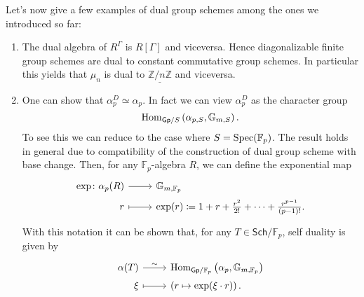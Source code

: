 \noindent
Let's now give a few examples of dual group schemes among the ones we introduced so far:
\begin{ex}[]\leavevmode\vspace{-.2\baselineskip}\label{ex:GroupSchemeDuality}
\begin{enumerate}
	\item The dual algebra of $R^\Gamma$ is $R[\Gamma]$ and viceversa.
		Hence diagonalizable finite group schemes are dual to constant commutative group schemes.
		In particular this yields that $\mu_n$ is dual to $\underline{\mathbb{Z}/n\mathbb{Z}}$
		and viceversa.

	\item One can show that $\alpha_p^D \simeq \alpha_p$.
		In fact we can view $\alpha_p^D$ as the character group
		\begin{equation*}
			\operatorname{Hom}_{\mathsf{Gp}/S} \left( \alpha_{p,S}, \mathbb{G}_{m,S} \right)
		.\end{equation*}
		To see this we can reduce to the case where 
		$S = \operatorname{Spec}(\mathbb{F}_p)$.
		The result holds in general due to compatibility of the construction of
		dual group scheme with base change.
		Then, for any $\mathbb{F}_{p}$-algebra $R$, we can define the exponential map
		\begin{equation*}
		\begin{tikzcd}[row sep = 0ex
			,/tikz/column 1/.append style={anchor=base east}
			,/tikz/column 2/.append style={anchor=base west}]
			\mathrm{exp}\colon \alpha_p(R) \arrow[r, "", rightarrow] &
			\mathbb{G}_{m,\mathbb{F}_{p}} \\
			r \arrow[r, "", mapsto] & \mathrm{exp}(r) \coloneqq
			1 + r + \frac{r^2}{2!} + \cdots + \frac{r^{p-1}}{\left( p-1 \right)!}
		.\end{tikzcd}
		\end{equation*} 
		With this notation it can be shown that, for any
		$T \in \mathsf{Sch}/\mathbb{F}_{p}$, self duality is given by
		\begin{equation*}
		\begin{tikzcd}[row sep = 0ex
			,/tikz/column 1/.append style={anchor=base east}
			,/tikz/column 2/.append style={anchor=base west}]
			\alpha(T) \arrow[r, "\sim", rightarrow] &
			\Hom_{\mathsf{Gp}/\mathbb{F}_{p} }
			\left( \alpha_p, \mathbb{G}_{m,\mathbb{F}_{p}} \right) \\
			\xi \arrow[r, "", mapsto] & 
			\left( r \mapsto \mathrm{exp}(\xi \cdot r) \right)
		.\end{tikzcd}
		\end{equation*} 
\end{enumerate}
\end{ex}



